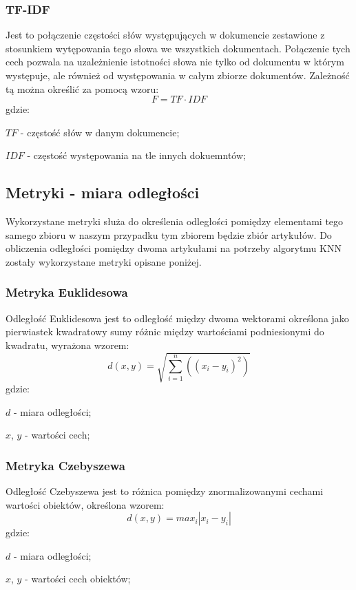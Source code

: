 \documentclass{classrep}
\begin{document}
\subsubsection{TF-IDF}
Jest to połączenie częstości słów występujących w dokumencie zestawione z stosunkiem wytępowania tego słowa we wszystkich
dokumentach. Połączenie tych cech pozwala na uzależnienie istotności słowa nie tylko od dokumentu w którym występuje,
ale również od występowania w całym zbiorze dokumentów. Zależność tą można określić za pomocą wzoru:
\begin{equation}
    F={TF}\cdot{IDF}
\end{equation}
gdzie:\\
\begin{description}
    \item $TF$ - częstość słów w danym dokumencie;
    \item $IDF$ - częstość występowania na tle innych dokuemntów;
\end{description}

\subsection{Metryki - miara odległości}
Wykorzystane metryki służa do określenia odległości pomiędzy elementami tego samego zbioru w naszym przypadku tym
zbiorem będzie zbiór artykułów. Do obliczenia odległości pomiędzy dwoma artykułami na potrzeby algorytmu KNN zostały
wykorzystane metryki opisane poniżej.

\subsubsection{Metryka Euklidesowa}
Odległość Euklidesowa jest to odległość między dwoma wektorami określona jako pierwiastek kwadratowy sumy różnic między
wartościami podniesionymi do kwadratu, wyrażona wzorem:
\begin{equation}
    d(x,y)=\sqrt{\sum_{i=1}^{n}((x_{i}-y_{i})^{2})}
\end{equation}
gdzie:\\
\begin{description}
    \item $d$ - miara odległości;
    \item $x$, $y$ - wartości cech;
\end{description}

\subsubsection{Metryka Czebyszewa}
Odległość Czebyszewa jest to różnica pomiędzy znormalizowanymi cechami wartości obiektów, określona wzorem:
\begin{equation}
    d(x,y)=max_{i}|x_{i}-y_{i}|
\end{equation}
gdzie:\\
\begin{description}
    \item $d$ - miara odległości;
    \item $x$, $y$ - wartości cech obiektów;
\end{description}
\end{document}

